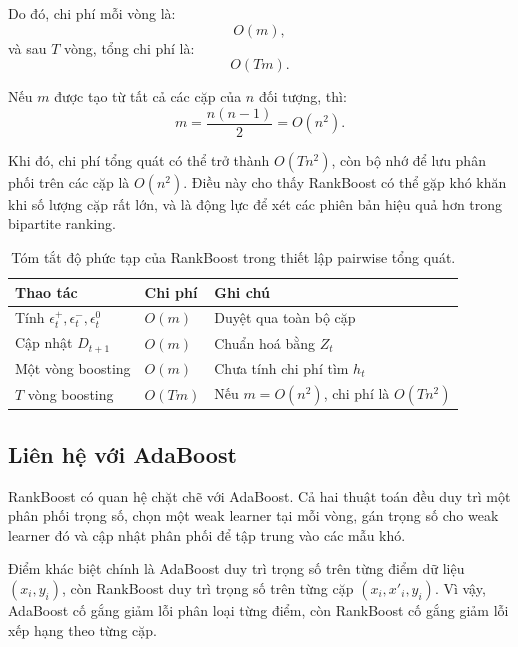 Do đó, chi phí mỗi vòng là:
\[
    O(m),
\]
và sau \(T\) vòng, tổng chi phí là:
\[
    O(Tm).
\]

Nếu \(m\) được tạo từ tất cả các cặp của \(n\) đối tượng, thì:
\[
    m=
    \frac{n(n-1)}{2}
    =
    O(n^2).
\]

Khi đó, chi phí tổng quát có thể trở thành \(O(Tn^2)\), còn bộ nhớ để lưu phân phối trên các cặp là \(O(n^2)\). Điều này cho thấy RankBoost có thể gặp khó khăn khi số lượng cặp rất lớn, và là động lực để xét các phiên bản hiệu quả hơn trong bipartite ranking.

\begin{table}[H]
    \centering
    \begin{tabular}{lll}
        \toprule
        \textbf{Thao tác} & \textbf{Chi phí} & \textbf{Ghi chú} \\
        \midrule
        Tính \(\epsilon_t^+,\epsilon_t^-,\epsilon_t^0\) & \(O(m)\) & Duyệt qua toàn bộ cặp \\
        Cập nhật \(D_{t+1}\) & \(O(m)\) & Chuẩn hoá bằng \(Z_t\) \\
        Một vòng boosting & \(O(m)\) & Chưa tính chi phí tìm \(h_t\) \\
        \(T\) vòng boosting & \(O(Tm)\) & Nếu \(m=O(n^2)\), chi phí là \(O(Tn^2)\) \\
        \bottomrule
    \end{tabular}
    \caption{Tóm tắt độ phức tạp của RankBoost trong thiết lập pairwise tổng quát.}
    \label{tab:section5-rankboost-complexity}
\end{table}

\subsection{Liên hệ với AdaBoost}

RankBoost có quan hệ chặt chẽ với AdaBoost. Cả hai thuật toán đều duy trì một phân phối trọng số, chọn một weak learner tại mỗi vòng, gán trọng số cho weak learner đó và cập nhật phân phối để tập trung vào các mẫu khó.

Điểm khác biệt chính là AdaBoost duy trì trọng số trên từng điểm dữ liệu \((x_i,y_i)\), còn RankBoost duy trì trọng số trên từng cặp \((x_i,x'_i,y_i)\). Vì vậy, AdaBoost cố gắng giảm lỗi phân loại từng điểm, còn RankBoost cố gắng giảm lỗi xếp hạng theo từng cặp.

